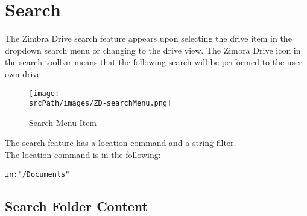 \section{Search}
The Zimbra Drive search feature appears upon selecting the drive item in the dropdown search menu or changing to the drive view.
The Zimbra Drive icon in the search toolbar means that the following search will be performed to the user own drive.
\begin{figure}[htbp,!h] 
\centering 
\texttt{[image: \\srcPath/images/ZD-searchMenu.png]} 
\caption{Search Menu Item} 
\label{fig:searchMenu}
\end{figure}

The search feature has a location command and a string filter.\\
The location command is in the following:
\begin{verbatim}
in:"/Documents"
\end{verbatim}

\subsection{Search Folder Content}
